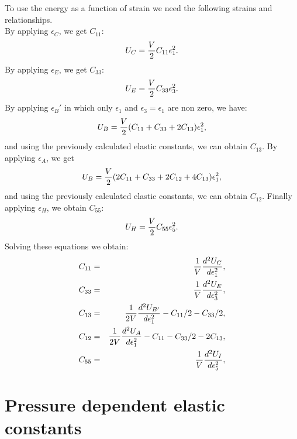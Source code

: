 \documentclass[12pt,a4paper]{article}
\begin{document}
To use the energy as a function of strain 
we need the following strains and relationships. \\
By applying $\epsilon_C$, we get $C_{11}$:
\begin{equation}
U_C= {V \over 2} C_{11} \epsilon_1^2.
\end{equation}
By applying $\epsilon_E$, we get $C_{33}$:
\begin{equation}
U_E= {V \over 2} C_{33} \epsilon_3^2.
\end{equation}
By applying $\epsilon_B'$ in which only $\epsilon_1$ and 
$\epsilon_3=\epsilon_1$ are non zero, we have:
\begin{equation}
U_B= {V \over 2} (C_{11} + C_{33} + 2 C_{13}) \epsilon_1^2,
\end{equation}
and using the previously calculated elastic constants, we can obtain $C_{13}$.
By applying $\epsilon_A$, we get
\begin{equation}
U_B= {V \over 2} (2C_{11} + C_{33} + 2 C_{12} + 4 C_{13}) \epsilon_1^2,
\end{equation}
and using the previously calculated elastic constants, we can obtain $C_{12}$.
Finally applying $\epsilon_H$, we obtain $C_{55}$:
\begin{equation}
U_H= {V \over 2} C_{55} \epsilon_5^2.
\end{equation}
Solving these equations we obtain:
\begin{eqnarray}
C_{11}&=&{1 \over V} {d^2 U_C \over d \epsilon_1^2}, \\ 
C_{33}&=&{1 \over V} {d^2 U_E \over d \epsilon_3^2}, \\ 
C_{13}&=&{1 \over 2 V} {d^2 U_{B'} \over d \epsilon_1^2} - C_{11}/2 - C_{33}/2, \\
C_{12}&=&{1 \over 2 V} {d^2 U_A \over d \epsilon_1^2} - C_{11} - C_{33}/2
- 2 C_{13}, \\
C_{55}&=&{1 \over V} {d^2 U_I \over d \epsilon_5^2}, \\
\end{eqnarray}


\newpage
\section{\color{coral}Pressure dependent elastic constants}
\end{document}
